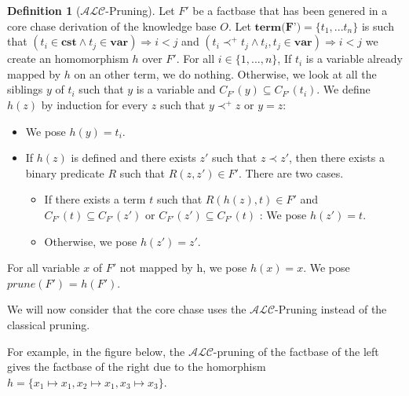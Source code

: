 \documentclass{article}
\theoremstyle{definition}
\newtheorem{definition}{Definition}[section]
\theoremstyle{remark}
\begin{document}
\begin{definition}[$\mathcal{ALC}$-Pruning]
Let $F'$ be a factbase that has been genered in a core chase derivation of the knowledge base $O$. Let $\textbf{term(F')} = \{t_1,...t_n\}$ is such that $(t_i \in \textbf{cst} \wedge t_j \in \textbf{var}) \Rightarrow i < j$ and $(t_i \prec^+ t_j \wedge t_i,t_j \in \textbf{var}) \Rightarrow i < j$
we create an homomorphism $h$ over $F'$.
For all $i \in \{1,...,n\}$,
If $t_i$ is a variable already mapped by $h$ on an other term, we do nothing.
Otherwise, we look at all the siblings $y$ of $t_i$ such that $y$ is a variable and $C_{F'}(y) \subseteq C_{F'}(t_i)$. We define $h(z)$ by induction for every $z$ such that $y \prec^+ z$ or $y = z$:
\begin{itemize}
\item We pose $h(y) = t_i$.
\item If $h(z)$ is defined and there exists $z'$ such that $z \prec z'$, then there exists a binary predicate $R$ such that $R(z,z') \in F'$. There are two cases.
\begin{itemize}
\item If there exists a term $t$ such that $R(h(z),t) \in F'$ and $C_{F'}(t) \subseteq C_{F'}(z')$ or $C_{F'}(z') \subseteq C_{F'}(t)$ : We pose $h(z') = t$.
\item Otherwise, we pose $h(z') = z'$. 
\end{itemize}
\end{itemize}
For all variable $x$ of $F'$ not mapped by h, we pose $h(x) = x$. We pose \emph{$\textit{prune}(F')$} = $h(F')$.
\end{definition}

We will now consider that the core chase uses the $\mathcal{ALC}$-Pruning instead of the classical pruning.

For example, in the figure below, the $\mathcal{ALC}$-pruning of the factbase of the left gives the factbase of the right due to the homorphism $h = \{x_1 \mapsto x_1, x_2 \mapsto x_1, x_3 \mapsto x_3\}$.
\end{document}
